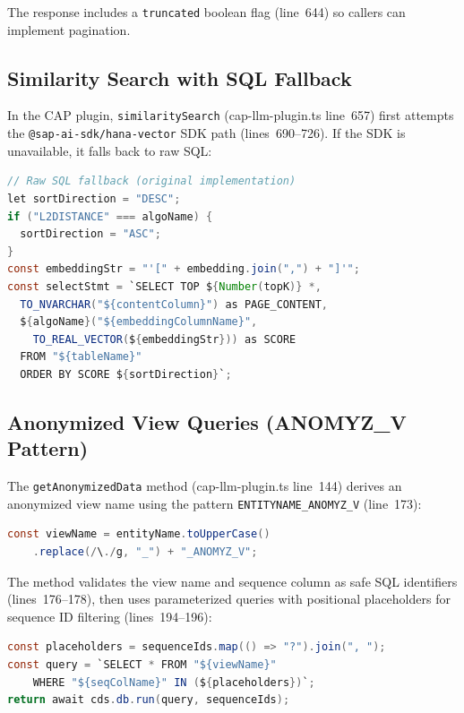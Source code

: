 \documentclass[11pt]{article}
\newcommand{\code}[1]{\texttt{#1}}
\begin{document}
The response includes a \code{truncated} boolean flag (line~644) so callers
can implement pagination.

\subsection{Similarity Search with SQL Fallback}

In the CAP plugin, \code{similaritySearch} (cap-llm-plugin.ts line~657)
first attempts the \code{@sap-ai-sdk/hana-vector} SDK path (lines~690--726).
If the SDK is unavailable, it falls back to raw SQL:

\begin{lstlisting}[language=Java,caption={SQL fallback (cap-llm-plugin.ts lines 728--740)},label=lst:sql-fallback]
// Raw SQL fallback (original implementation)
let sortDirection = "DESC";
if ("L2DISTANCE" === algoName) {
  sortDirection = "ASC";
}
const embeddingStr = "'[" + embedding.join(",") + "]'";
const selectStmt = `SELECT TOP ${Number(topK)} *,
  TO_NVARCHAR("${contentColumn}") as PAGE_CONTENT,
  ${algoName}("${embeddingColumnName}",
    TO_REAL_VECTOR(${embeddingStr})) as SCORE
  FROM "${tableName}"
  ORDER BY SCORE ${sortDirection}`;
\end{lstlisting}

\subsection{Anonymized View Queries (ANOMYZ\_V Pattern)}

The \code{getAnonymizedData} method (cap-llm-plugin.ts line~144) derives an
anonymized view name using the pattern
\code{ENTITYNAME\_ANOMYZ\_V} (line~173):

\begin{lstlisting}[language=Java,caption={Anonymized view name derivation (cap-llm-plugin.ts line 173)},label=lst:anomyz]
const viewName = entityName.toUpperCase()
    .replace(/\./g, "_") + "_ANOMYZ_V";
\end{lstlisting}

The method validates the view name and sequence column as safe SQL
identifiers (lines~176--178), then uses parameterized queries with
positional placeholders for sequence ID filtering (lines~194--196):

\begin{lstlisting}[language=Java,caption={Parameterized query (cap-llm-plugin.ts lines 194--196)},label=lst:param-query]
const placeholders = sequenceIds.map(() => "?").join(", ");
const query = `SELECT * FROM "${viewName}"
    WHERE "${seqColName}" IN (${placeholders})`;
return await cds.db.run(query, sequenceIds);
\end{lstlisting}
\end{document}

